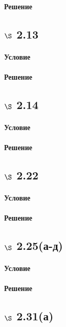 \documentclass[a4paper,12pt]{article}
\begin{document}
\paragraph*{Решение}

\subsection*{$\S$ 2.13}
\paragraph*{Условие}
\paragraph*{Решение}

\subsection*{$\S$ 2.14}
\paragraph*{Условие}
\paragraph*{Решение}

\subsection*{$\S$ 2.22}
\paragraph*{Условие}
\paragraph*{Решение}

\subsection*{$\S$ 2.25(а-д)}
\paragraph*{Условие}
\paragraph*{Решение}

\subsection*{$\S$ 2.31(а)}
\end{document}
